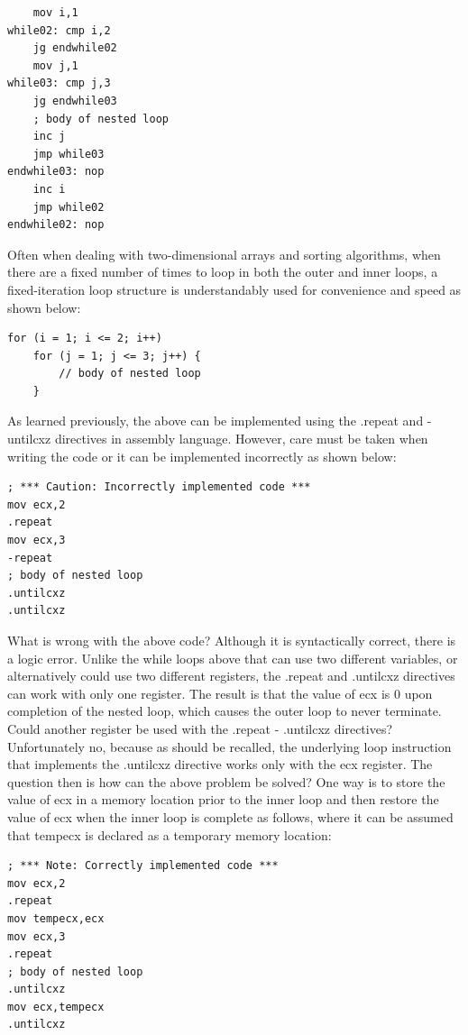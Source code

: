 \documentclass[10pt]{article}
\begin{document}
\begin{verbatim}
    mov i,1
while02: cmp i,2
    jg endwhile02
    mov j,1
while03: cmp j,3
    jg endwhile03
    ; body of nested loop
    inc j
    jmp while03
endwhile03: nop
    inc i
    jmp while02
endwhile02: nop
\end{verbatim}

Often when dealing with two-dimensional arrays and sorting algorithms, when there are a fixed number of times to loop in both the outer and inner loops, a fixed-iteration loop structure is understandably used for convenience and speed as shown below:

\begin{verbatim}
for (i = 1; i <= 2; i++)
    for (j = 1; j <= 3; j++) {
        // body of nested loop
    }
\end{verbatim}

As learned previously, the above can be implemented using the .repeat and -untilcxz directives in assembly language. However, care must be taken when writing the code or it can be implemented incorrectly as shown below:

\begin{verbatim}
; *** Caution: Incorrectly implemented code ***
mov ecx,2
.repeat
mov ecx,3
-repeat
; body of nested loop
.untilcxz
.untilcxz
\end{verbatim}

What is wrong with the above code? Although it is syntactically correct, there is a logic error. Unlike the while loops above that can use two different variables, or alternatively could use two different registers, the .repeat and .untilcxz directives can work with only one register. The result is that the value of ecx is 0 upon completion of the nested loop, which causes the outer loop to never terminate. Could another register be used with the .repeat - .untilcxz directives? Unfortunately no, because as should be recalled, the underlying loop instruction that implements the .untilcxz directive works only with the ecx register. The question then is how can the above problem be solved? One way is to store the\\
value of ecx in a memory location prior to the inner loop and then restore the value of ecx when the inner loop is complete as follows, where it can be assumed that tempecx is declared as a temporary memory location:

\begin{verbatim}
; *** Note: Correctly implemented code ***
mov ecx,2
.repeat
mov tempecx,ecx
mov ecx,3
.repeat
; body of nested loop
.untilcxz
mov ecx,tempecx
.untilcxz
\end{verbatim}
\end{document}
